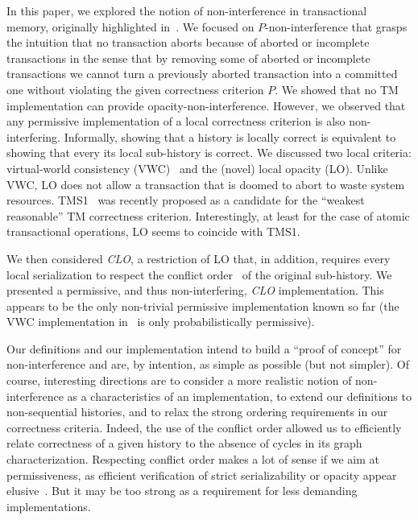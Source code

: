 \documentclass{llncs}
\newcommand{\clo} {\textit{CLO}}
\begin{document}
In this paper, we explored the notion of
non-interference in transactional memory, 
originally highlighted in~\cite{SatVid:2011:ICDCN, SatVid:2012:ICDCN}.
We focused on  $P$-non-interference that 
grasps the intuition that no transaction aborts because of aborted or incomplete
transactions in the sense that by removing some of aborted or incomplete
transactions we cannot turn a previously aborted transaction into a
committed one 
without violating the given correctness criterion $P$.
We showed that no TM implementation can provide
opacity-non-interference.
However, we observed that any permissive implementation of a local 
correctness criterion is also non-interfering.
Informally, showing that a history is locally correct is equivalent
to showing that every its local sub-history is correct.
We discussed two local criteria: virtual-world
consistency (VWC)~\cite{ImbsRay:2009:SIROCCO} and the (novel) local
opacity (LO).
Unlike VWC, LO does not allow a transaction that is
doomed to abort to waste system resources.
TMS1~\cite{DGLM13} was recently proposed as a candidate for the 
``weakest reasonable''  TM correctness criterion. 
Interestingly, at least for the case of atomic transactional
operations, LO seems to coincide with TMS1.   


We then considered \clo{}, a restriction of LO that, in addition, requires every
local serialization to respect the conflict
order~\cite{Papad:1979:JACM,Hadzilacos:1988:JACM} of the original sub-history. 
We presented a permissive, and thus non-interfering, \clo{} implementation.  
This appears to be the only non-trivial permissive implementation known so far 
(the VWC implementation in~\cite{CIR11} is only probabilistically permissive).  

Our definitions and our implementation intend to build a ``proof of concept''
for non-interference and are, by intention, as simple as possible (but not
simpler). Of course, interesting directions are to consider a more
realistic notion of non-interference as a characteristics of an
implementation, to extend our
definitions to non-sequential histories, and to
relax the strong ordering requirements in our correctness criteria.
Indeed, the use of the conflict order allowed us to efficiently relate 
correctness  of a given history to the absence of cycles in its graph
characterization. Respecting conflict order makes a lot of sense if we aim at
permissiveness, as efficient verification of strict
serializability or opacity appear elusive~\cite{Papad:1979:JACM}.
But it may be too strong as a requirement for less demanding implementations.
\end{document}
